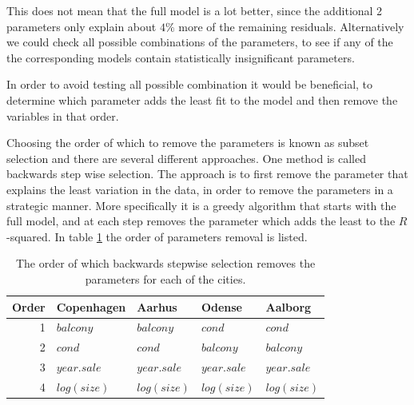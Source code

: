     This does not mean that the full model is a lot better, since the additional 2 parameters only explain about $4\%$ more of the remaining residuals. 
    Alternatively we could check all possible combinations of the parameters, to see if any of the the corresponding models contain statistically insignificant parameters. 
    
    In order to avoid testing all possible combination it would be beneficial, to determine which parameter adds the least fit to the model and then remove the variables in that order. 

Choosing the order of which to remove the parameters is known as subset selection and there are several different approaches.
One method is called backwards step wise selection. 
The approach is to first remove the parameter that explains the least variation in the data, in order to remove the parameters in a strategic manner.
More specifically it is a greedy algorithm that starts with the full model, and at each step removes the parameter which adds the least to the $R$-squared. 
In table \ref{tbl:backward_order_of_parameters} the order of parameters removal is listed.
    
\begin{table}[H]
    \centering
    \begin{tabular}{r|llll}
        \toprule
        \textbf{Order} & \textbf{Copenhagen} & \textbf{Aarhus} & \textbf{Odense} & \textbf{Aalborg}\\
        \midrule
        1 & $balcony$              & $balcony$         & $cond$            & $cond$ \\
        2 & $cond$           & $cond$            & $balcony$         & $balcony$ \\
        3 & $year.sale$    & $year.sale$  & $year.sale$  & $year.sale$ \\
        4 & $log(size)$         & $log(size)$       & $log(size)$       & $log(size)$ \\
        \bottomrule
    \end{tabular}
    \caption{The order of which backwards stepwise selection removes the parameters for each of the cities.}
    \label{tbl:backward_order_of_parameters}
\end{table}

